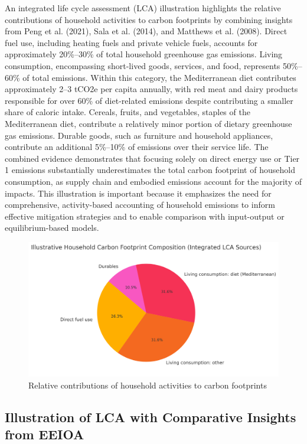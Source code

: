 \documentclass[12pt,a4paper]{article}%
\begin{document}
An integrated life cycle assessment (LCA) illustration highlights the relative contributions of household activities to carbon footprints by combining insights from Peng et al. (2021), Sala et al. (2014), and Matthews et al. (2008). Direct fuel use, including heating fuels and private vehicle fuels, accounts for approximately 20\%–30\% of total household greenhouse gas emissions. Living consumption, encompassing short-lived goods, services, and food, represents 50\%–60\% of total emissions. Within this category, the Mediterranean diet contributes approximately 2–3 tCO2e per capita annually, with red meat and dairy products responsible for over 60\% of diet-related emissions despite contributing a smaller share of caloric intake. Cereals, fruits, and vegetables, staples of the Mediterranean diet, contribute a relatively minor portion of dietary greenhouse gas emissions. Durable goods, such as furniture and household appliances, contribute an additional 5\%–10\% of emissions over their service life. The combined evidence demonstrates that focusing solely on direct energy use or Tier 1 emissions substantially underestimates the total carbon footprint of household consumption, as supply chain and embodied emissions account for the majority of impacts. This illustration is important because it emphasizes the need for comprehensive, activity-based accounting of household emissions to inform effective mitigation strategies and to enable comparison with input-output or equilibrium-based models.
\begin{figure}[h]
\centering
\includegraphics[width=0.8\linewidth]{LCA_pie_chart.png}
\caption{Relative contributions of household activities to carbon footprints}
\end{figure}

\subsection{Illustration of LCA with Comparative Insights from EEIOA}
\end{document}
